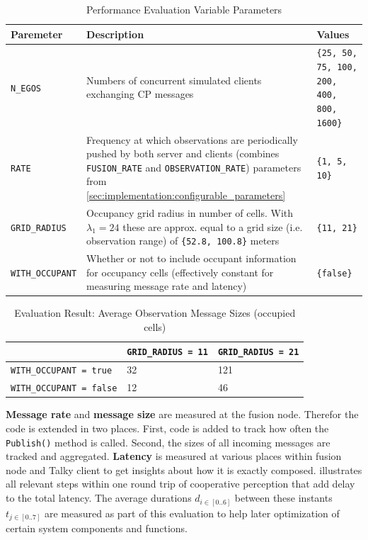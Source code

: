 \begin{table}
	\centering
	\begin{tabular}{|p{3cm}|p{8.7cm}|p{3.5cm}|}
		\hline 
		\textbf{Paremeter} & \textbf{Description} & \textbf{Values} \\ 
		\hline 
		\texttt{N\_EGOS} & Numbers of concurrent simulated clients exchanging CP messages & \texttt{\{25, 50, 75, 100, 200, 400, 800, 1600\}} \\ 
		\hline 
		\texttt{RATE} & Frequency at which observations are periodically pushed by both server and clients (combines \texttt{FUSION\_RATE} and \texttt{OBSERVATION\_RATE}) parameters from \cref{sec:implementation:configurable_parameters} & \texttt{\{1, 5, 10\}} \\ 
		\hline 
		\texttt{GRID\_RADIUS} & Occupancy grid radius in number of cells. With $\lambda_1 = 24$ these are approx. equal to a grid size (i.e. observation range) of \texttt{\{52.8, 100.8\}} meters & \texttt{\{11, 21\}} \\ 
		\hline 
		\texttt{WITH\_OCCUPANT} & Whether or not to include occupant information for occupancy cells (effectively constant for measuring message rate and latency) & \texttt{\{false\}} \\ 
		\hline 
	\end{tabular}
	\caption{Performance Evaluation Variable Parameters}
	\label{tab:performance_evaluation:variable_parameters}
\end{table}

\begin{table}
	\centering
	\begin{tabular}{|p{6.2cm}|p{3.5cm}|p{3.5cm}|}
		\hline 
		& \texttt{GRID\_RADIUS = 11} & \texttt{GRID\_RADIUS = 21} \\ 
		\hline 
		\texttt{WITH\_OCCUPANT = true} & \SI{32}{\kilo\byte} & 1\SI{21}{\kilo\byte} \\ 
		\hline 
		\texttt{WITH\_OCCUPANT = false} & \SI{12}{\kilo\byte} & \SI{46}{\kilo\byte} \\ 
		\hline 
	\end{tabular}
	\caption[Evaluation Result: Average Observation Message Sizes]{Evaluation Result: Average Observation Message Sizes (occupied cells)}
	\label{tab:performance_evaluation:message:sizes}
\end{table}

\textbf{Message rate} and \textbf{message size} are measured at the fusion node. Therefor the code is extended in two places. First, code is added to track how often the \texttt{Publish()} method is called. Second, the sizes of all incoming messages are tracked and aggregated. \textbf{Latency} is measured at various places within fusion node and Talky client to get insights about how it is exactly composed.  illustrates all relevant steps within one round trip of cooperative perception that add delay to the total latency. The average durations $d_{i \in [0..6]}$ between these instants $t_{j \in [0..7]}$ are measured as part of this evaluation to help later optimization of certain system components and functions.

